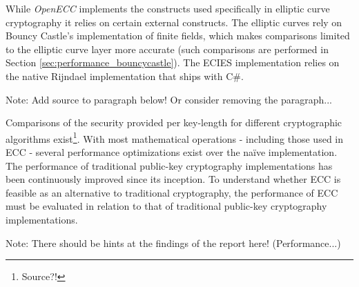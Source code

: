 While \emph{OpenECC} implements the constructs used specifically in elliptic curve cryptography it relies on certain
external constructs. The elliptic curves rely on Bouncy Castle's implementation of finite fields, which makes comparisons
limited to the elliptic curve layer more accurate (such comparisons are performed in Section \ref{sec:performance_bouncycastle}).
The ECIES implementation relies on the native Rijndael implementation that ships with C\#.

Note: Add source to paragraph below! Or consider removing the paragraph...

Comparisons of the security provided per key-length for different cryptographic algorithms exist\footnote{Source?!}. With
most mathematical operations - including those used in ECC - several performance optimizations exist over the naïve
implementation. The performance of traditional public-key cryptography implementations has been continuously improved
since its inception. To understand whether ECC is feasible as an alternative to traditional cryptography, the performance
of ECC must be evaluated in relation to that of traditional public-key cryptography implementations.

Note: There should be hints at the findings of the report here! (Performance...)